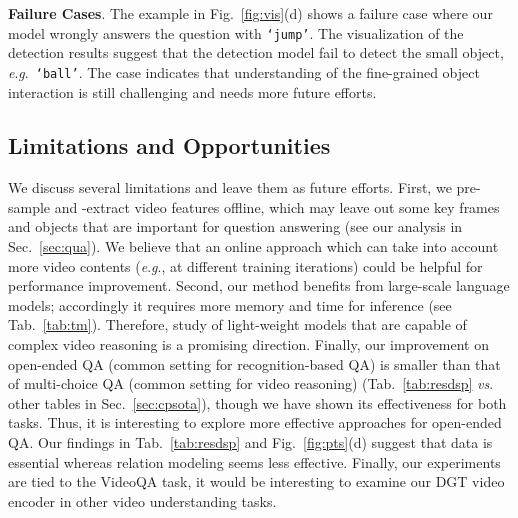 \documentclass[10pt,journal,compsoc]{IEEEtran}
\newcommand{\vs}{\textit{vs}. }
\newcommand{\eg}{\textit{e}.\textit{g}.}
\begin{document}
\textbf{Failure Cases}.
The example in Fig.~\ref{fig:vis}(d) shows a failure case where our model wrongly answers the question with \texttt{`jump'}. The visualization of the detection results suggest that the detection model fail to detect the small object, \eg~\texttt{`ball'}. The case indicates that understanding of the fine-grained object interaction is still challenging and needs more future efforts. \subsection{Limitations and Opportunities}
We discuss several limitations and leave them as future efforts. First, we pre-sample and -extract video features offline, which may leave out some key frames and objects that are important for question answering (see our analysis in Sec.~\ref{sec:qua}). We believe that an online approach which can take into account more video contents (\eg, at different training iterations) could be helpful for performance improvement. Second, our method benefits from large-scale language models; accordingly it requires more memory and time for inference (see Tab.~\ref{tab:tm}). Therefore, study of light-weight models that are capable of complex video reasoning is a promising direction. Finally, our improvement on open-ended QA (common setting for recognition-based QA) is smaller than that of multi-choice QA (common setting for video reasoning) (Tab.~\ref{tab:resdsp} \vs other tables in Sec.~\ref{sec:cpsota}), though we have shown its effectiveness for both tasks. Thus, it is interesting to explore more effective approaches for open-ended QA. Our findings in Tab.~\ref{tab:resdsp} and Fig.~\ref{fig:pts}(d) suggest that data is essential whereas relation modeling seems less effective. Finally, our experiments are tied to the VideoQA task, it would be interesting to examine our DGT video encoder in other video understanding tasks.
\end{document}
